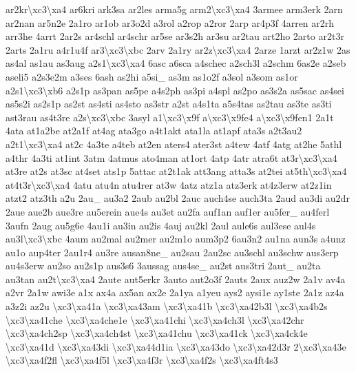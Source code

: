 \begin{DoxyCompactItemize}
ar2kr\textbackslash{}xc3\textbackslash{}xa4 ar6kri ark3sa ar2les arma5g arm2\textbackslash{}xc3\textbackslash{}xa4 3armee arm3erk 2arn ar2nan ar5n2e 2a1ro ar1ob ar3o2d a3rol a2rop a2ror 2arp ar4p3f 4arren ar2rh arr3he 4arrt 2ar2s ar4schl ar4schr ar5se ar3s2h ar3su ar2tau art2ho 2arto ar2t3r 2arts 2a1ru a4r1u4f ar3\textbackslash{}xc3\textbackslash{}xbc 2arv 2a1ry ar2z\textbackslash{}xc3\textbackslash{}xa4 2arze 1arzt ar2z1w 2as as4al as1au as3aug a2s1\textbackslash{}xc3\textbackslash{}xa4 6asc a6sca a4schec a2sch3l a2schm 6as2e a2seb aseli5 a2s3e2m a3ses 6ash as2hi a5si\-\_\- as3m as1o2f a3sol a3som as1or a2s1\textbackslash{}xc3\textbackslash{}xb6 a2s1p as3pan as5pe a4s2ph as3pi a4spl as2po as3s2a as5sac as4sei as5s2i as2s1p as2st as4sti as4sto as3str a2st a4s1ta a5s4tas as2tau as3te as3ti ast3rau as4t3re a2s\textbackslash{}xc3\textbackslash{}xbc 3asyl a1\textbackslash{}xc3\textbackslash{}x9f a\textbackslash{}xc3\textbackslash{}x9fe4 a\textbackslash{}xc3\textbackslash{}x9fen1 2a1t 4ata at1a2be at2a1f at4ag ata3go a4t1akt ata1la at1apf ata3s a2t3au2 a2t1\textbackslash{}xc3\textbackslash{}xa4 at2c 4a3te a4teb at2en aters4 ater3st a4tew 4atf 4atg at2he 5athl a4thr 4a3ti at1int 3atm 4atmus ato4man at1ort 4atp 4atr atra6t at3r\textbackslash{}xc3\textbackslash{}xa4 at3re at2s at3sc at4set ats1p 5attac at2t1ak att3ang atta3s at2tei at5th\textbackslash{}xc3\textbackslash{}xa4 at4t3r\textbackslash{}xc3\textbackslash{}xa4 4atu atu4n atu4rer at3w 4atz atz1a atz3erk at4z3erw at2z1in atzt2 atz3th a2u 2au\-\_\- au3a2 2aub au2bl 2auc auch4se auch3ta 2aud au3di au2dr 2aue aue2b aue3re au5erein aue4s au3et au2fa auf1an auf1er au5fer\-\_\- au4ferl 3aufn 2aug au5g6e 4au1i au3in au2is 4auj au2kl 2aul aule6s aul3ese aul4s au3l\textbackslash{}xc3\textbackslash{}xbc 4aum au2mal au2mer au2m1o aum3p2 6au3n2 au1na aun3s a4unz au1o aup4ter 2au1r4 au3re ausan8ne\-\_\- au2sau 2au2sc au3schl au3schw aus3erp au4s3erw au2so au2s1p aus3s6 3aussag aus4se\-\_\- au2st aus3tri 2aut\-\_\- au2ta au3tan au2t\textbackslash{}xc3\textbackslash{}xa4 2aute aut5erkr 3auto aut2o3f 2auts 2aux auz2w 2a1v av4a a2vr 2a1w awi3e a1x ax4a ax5an ax2e 2a1ya a1yeu ays2 aysi1e ay1ste 2a1z az4a a3z2i az2u \textbackslash{}xc3\textbackslash{}xa41a \textbackslash{}xc3\textbackslash{}xa43am \textbackslash{}xc3\textbackslash{}xa41b \textbackslash{}xc3\textbackslash{}xa42b3l \textbackslash{}xc3\textbackslash{}xa4b2s \textbackslash{}xc3\textbackslash{}xa41che \textbackslash{}xc3\textbackslash{}xa4che1e \textbackslash{}xc3\textbackslash{}xa41chi \textbackslash{}xc3\textbackslash{}xa4ch3l \textbackslash{}xc3\textbackslash{}xa42chr \textbackslash{}xc3\textbackslash{}xa4ch2sp \textbackslash{}xc3\textbackslash{}xa4ch4st \textbackslash{}xc3\textbackslash{}xa41chu \textbackslash{}xc3\textbackslash{}xa41ck \textbackslash{}xc3\textbackslash{}xa4ck4e \textbackslash{}xc3\textbackslash{}xa41d \textbackslash{}xc3\textbackslash{}xa43di \textbackslash{}xc3\textbackslash{}xa44d1ia \textbackslash{}xc3\textbackslash{}xa43do \textbackslash{}xc3\textbackslash{}xa42d3r 2\textbackslash{}xc3\textbackslash{}xa43e \textbackslash{}xc3\textbackslash{}xa4f2fl \textbackslash{}xc3\textbackslash{}xa4f5l \textbackslash{}xc3\textbackslash{}xa4f3r \textbackslash{}xc3\textbackslash{}xa4f2s \textbackslash{}xc3\textbackslash{}xa4ft4s3 
\end{DoxyCompactItemize}
